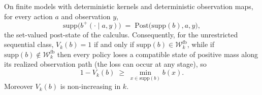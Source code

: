 \begin{theorem}\label{thm:support}
On finite models with deterministic kernels and deterministic
observation maps, for every action \(a\) and
observation \(y\),
\[
\mathrm{supp}\bigl(b^{+}(\cdot \mid a, y)\bigr)
\;=\; \mathrm{Post}\bigl(\mathrm{supp}(b), a, y\bigr),
\]
the set-valued post-state of the calculus. Consequently, for the
unrestricted sequential class,
\(V_{k}(b) = 1\) if and only if
\(\mathrm{supp}(b) \in \mathcal{W}^{\mathrm{fb}}_{k}\), while if
\(\mathrm{supp}(b) \notin \mathcal{W}^{\mathrm{fb}}_{k}\) then every policy loses a
compatible state of positive mass along its realized observation path
(the loss can occur at any stage), so
\[
1 - V_{k}(b) \;\ge\; \min_{x \in \mathrm{supp}(b)} b(x).
\]
Moreover \(V_{k}(b)\) is non-increasing in \(k\).\end{theorem}

%
%
%
%
%

